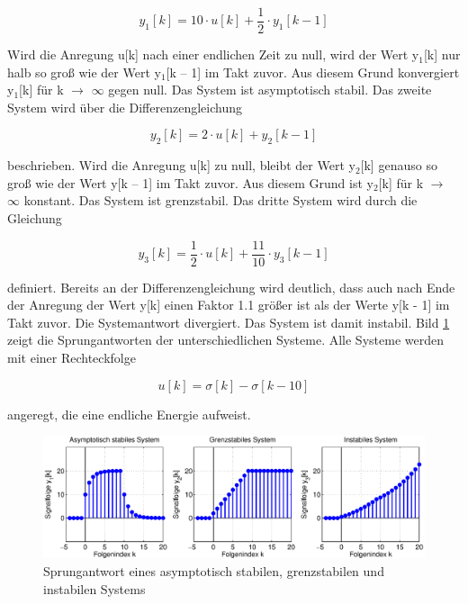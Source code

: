 \begin{equation}\label{eq:fourfourtyone}
y_{1} \left[k\right]=10\cdot u\left[k\right]+\frac{1}{2} \cdot y_{1} \left[k-1\right]
\end{equation}

\noindent Wird die Anregung u[k] nach einer endlichen Zeit zu null, wird der Wert y${}_{1}$[k] nur halb so gro{\ss} wie der Wert y${}_{1}$[k -- 1] im Takt zuvor. Aus diesem Grund konvergiert y${}_{1}$[k] f\"{u}r k $\rightarrow$ $\infty$ gegen null. Das System ist asymptotisch stabil. Das zweite System wird \"{u}ber die Differenzengleichung

\begin{equation}\label{eq:fourfourtytwo}
y_{2} \left[k\right]=2\cdot u\left[k\right]+y_{2} \left[k-1\right]
\end{equation}

\noindent beschrieben. Wird die Anregung u[k] zu null, bleibt der Wert y${}_{2}$[k] genauso so gro{\ss} wie der Wert y[k -- 1] im Takt zuvor. Aus diesem Grund ist y${}_{2}$[k] f\"{u}r k $\rightarrow$ $\infty$ konstant. Das System ist grenzstabil. Das dritte System wird durch die Gleichung 

\begin{equation}\label{eq:fourfourtythree}
y_{3} \left[k\right]=\frac{1}{2} \cdot u\left[k\right]+\frac{11}{10} \cdot y_{3} \left[k-1\right]
\end{equation}

\noindent definiert. Bereits an der Differenzengleichung wird deutlich, dass auch nach Ende der Anregung der Wert y[k] einen Faktor 1.1 gr\"{o}{\ss}er ist als der Werte y[k - 1] im Takt zuvor. Die Systemantwort divergiert. Das System ist damit instabil. Bild \ref{fig:RekursivTiefpassStabilitaet} zeigt die Sprungantworten der unterschiedlichen Systeme. Alle Systeme werden mit einer Rechteckfolge 

\begin{equation}\label{eq:fourfourtyfour}
u\left[k\right]=\sigma \left[k\right]-\sigma \left[k-10\right]
\end{equation}

\noindent angeregt, die eine endliche Energie aufweist.

\begin{figure}[H]
  \centerline{\includegraphics[width=1\textwidth]{Kapitel4/Bilder/image10.eps}}
  \caption{Sprungantwort eines asymptotisch stabilen, grenzstabilen und instabilen Systems}
  \label{fig:RekursivTiefpassStabilitaet}
\end{figure}

